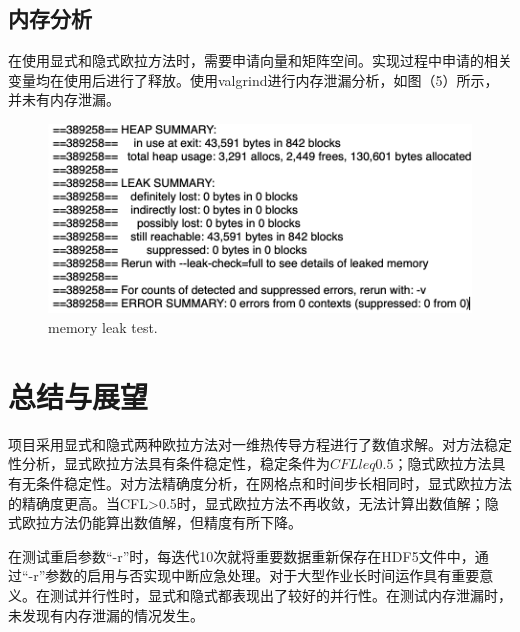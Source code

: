 \documentclass[final]{cvpr}
\begin{document}
\subsection{内存分析}
在使用显式和隐式欧拉方法时，需要申请向量和矩阵空间。实现过程中申请的相关变量均在使用后进行了释放。使用valgrind进行内存泄漏分析，如图（5）所示，并未有内存泄漏。
\begin{figure}[htpb]
	\centering
	\includegraphics[scale=0.50]{./figures/memory_test.png}
	\caption{memory leak test.}
	\label{figure}
\end{figure}




\section{总结与展望}\label{sec:Conclusion}
项目采用显式和隐式两种欧拉方法对一维热传导方程进行了数值求解。对方法稳定性分析，显式欧拉方法具有条件稳定性，稳定条件为$CFL leq 0.5$；隐式欧拉方法具有无条件稳定性。对方法精确度分析，在网格点和时间步长相同时，显式欧拉方法的精确度更高。当CFL>0.5时，显式欧拉方法不再收敛，无法计算出数值解；隐式欧拉方法仍能算出数值解，但精度有所下降。

在测试重启参数“-r”时，每迭代10次就将重要数据重新保存在HDF5文件中，通过“-r”参数的启用与否实现中断应急处理。对于大型作业长时间运作具有重要意义。在测试并行性时，显式和隐式都表现出了较好的并行性。在测试内存泄漏时，未发现有内存泄漏的情况发生。
\end{document}
